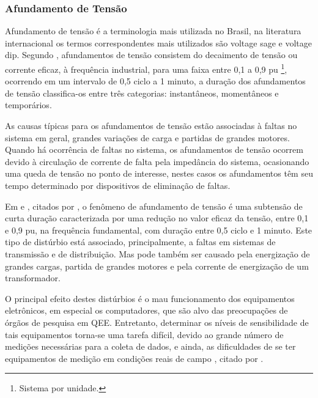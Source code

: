 \subsubsection{Afundamento de Tensão}
\par 
Afundamento de tensão é a terminologia mais utilizada no Brasil, na literatura internacional os termos correspondentes mais utilizados são voltage sage e voltage dip. Segundo \cite{FER99}, afundamentos de tensão consistem do decaimento de tensão ou corrente eficaz, à frequência industrial, para uma faixa entre 0,1 a 0,9 pu \footnote{Sistema por unidade.}, ocorrendo em um intervalo de 0,5 ciclo a 1 minuto, a duração dos afundamentos de tensão classifica-os entre três categorias: instantâneos, momentâneos e temporários.
\par 
As causas típicas para os afundamentos de tensão estão associadas à faltas no sistema em geral, grandes variações de carga e partidas de grandes motores. Quando há ocorrência de faltas no sistema, os afundamentos de tensão ocorrem devido à circulação de corrente de falta pela impedância do sistema, ocasionando uma queda de tensão no ponto de interesse, nestes casos os afundamentos têm seu tempo determinado por dispositivos de eliminação de faltas.
\par
Em \cite{OLIVE} e \cite{SIL01}, citados por \cite{DEL03}, o fenômeno de afundamento de tensão é uma subtensão de curta duração caracterizada por uma redução no valor eficaz da tensão, entre 0,1 e 0,9 pu, na frequência fundamental, com duração entre 0,5 ciclo e 1 minuto. Este tipo de distúrbio está associado, principalmente, a faltas em sistemas de transmissão e de distribuição. Mas pode também ser causado pela energização de grandes cargas, partida de grandes motores e pela corrente de energização de um transformador.
\par
O principal efeito destes distúrbios é o mau funcionamento dos equipamentos eletrônicos, em especial os computadores, que são alvo das preocupações de órgãos de pesquisa em QEE. Entretanto, determinar os níveis de sensibilidade de tais equipamentos torna-se uma tarefa difícil, devido ao grande número de medições necessárias para a coleta de dados, e ainda, as dificuldades de se ter equipamentos de medição em condições reais de campo \cite{OLIVE}, citado por \cite{DEL03}.

